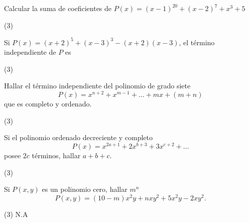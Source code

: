 \begin{multicols}{2}

    \begin{exercise}
        Calcular la suma de coeficientes de $P(x) = (x - 1)^{20} + (x - 2)^7 + x^3 + 5$
        \begin{tasks}[label=\Alph*)](3)
        \end{tasks}
    \end{exercise}

    \begin{exercise}
        Si $P(x) = (x + 2)^5 + (x - 3)^3 - (x + 2)(x - 3)$, el término independiente de $P$ es
        \begin{tasks}[label=\Alph*)](3)
        \end{tasks}
    \end{exercise}

    \begin{exercise}
        Hallar el término independiente del polinomio de grado siete
        \[
            P(x) = x^{n + 2} + x^{m - 1} + \ldots + mx + (m + n)
        \]
        que es completo y ordenado.
        \begin{tasks}[label=\Alph*)](3)
        \end{tasks}
    \end{exercise}

    \begin{exercise}
        Si el polinomio ordenado decreciente y completo
        \[
            P(x) = x^{2a + 1} + 2x^{b + 3} + 3x^{c + 2} + \ldots
        \]
        posee $2c$ términos, hallar $a + b + c$.
        \begin{tasks}[label=\Alph*)](3)
        \end{tasks}
    \end{exercise}

    \begin{exercise}
        Si $P(x, y)$ es un polinomio cero, hallar $m^n$
        \[
            P(x, y) = (10 - m)x^2 y + nxy^2 + 5x^2 y - 2xy^2.
        \]
        \begin{tasks}[label=\Alph*)](3)
        \task N.A
        \end{tasks}
    \end{exercise}



\end{multicols}

